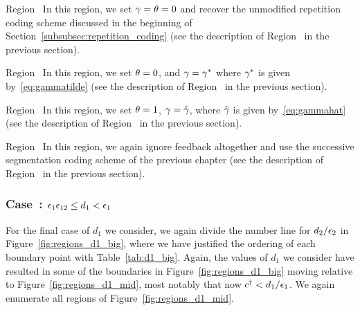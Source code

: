 

\begin{LaTeXdescription}
	\item[Region~\Rmnum{9}] In this region, we set $\gamma = \theta = 0$ and recover the unmodified repetition coding scheme discussed in the beginning of Section~\ref{subsubsec:repetition_coding} (see the description of Region~ in the previous section).

	\item[Region~\Rmnum{8}] In this region, we set $\theta = 0$, and $\gamma = \gamma^{*}$ where $\gamma^{*}$ is given by~\eqref{eq:gammatilde} (see the description of Region~ in the previous section).
	
	\item[Region~\Rmnum{7}]  In this region, we set $\theta= 1$, $\gamma = \hat{\gamma}$, where $\hat{\gamma}$ is given by~\eqref{eq:gammahat} (see the description of Region~ in the previous section).

	
	\item[Region~\Rmnum{6}]  In this region, we again ignore feedback altogether and use the successive segmentation coding scheme of the previous chapter (see the description of Region~ in the previous section).
\end{LaTeXdescription}

\subsubsection{Case~: $\epsilon_1\epsilon_{12} \leq d_1 < \epsilon_1$}

For the final case of $d_1$ we consider, we again divide the number line for $d_2/\epsilon_2$ in Figure~\ref{fig:regions_d1_big}, where we have justified the ordering of each boundary point with Table~\ref{tab:d1_big}.  Again, the values of $d_1$ we consider have resulted in some of the boundaries in Figure~\ref{fig:regions_d1_big} moving relative to Figure~\ref{fig:regions_d1_mid}, most notably that now $c^{\dagger} < d_1/\epsilon_1$.  We again enumerate all regions of Figure~\ref{fig:regions_d1_mid}.



